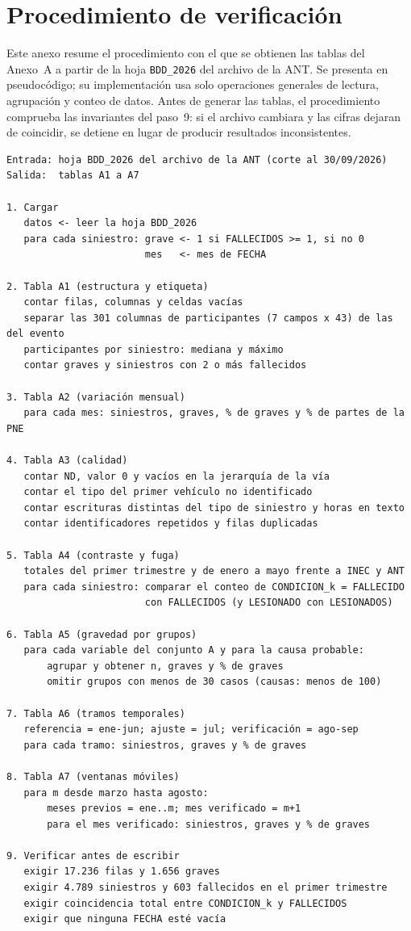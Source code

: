 \section{Procedimiento de verificación}

Este anexo resume el procedimiento con el que se obtienen las tablas del Anexo~A a partir de la hoja \texttt{BDD\_2026} del archivo de la ANT. Se presenta en pseudocódigo; su implementación usa solo operaciones generales de lectura, agrupación y conteo de datos. Antes de generar las tablas, el procedimiento comprueba las invariantes del paso~9: si el archivo cambiara y las cifras dejaran de coincidir, se detiene en lugar de producir resultados inconsistentes.

\begin{lstlisting}[style=codigo,caption={Procedimiento de verificación y generación de las tablas A1 a A7},label={lst:procedimiento}]
Entrada: hoja BDD_2026 del archivo de la ANT (corte al 30/09/2026)
Salida:  tablas A1 a A7

1. Cargar
   datos <- leer la hoja BDD_2026
   para cada siniestro: grave <- 1 si FALLECIDOS >= 1, si no 0
                        mes   <- mes de FECHA

2. Tabla A1 (estructura y etiqueta)
   contar filas, columnas y celdas vacías
   separar las 301 columnas de participantes (7 campos x 43) de las del evento
   participantes por siniestro: mediana y máximo
   contar graves y siniestros con 2 o más fallecidos

3. Tabla A2 (variación mensual)
   para cada mes: siniestros, graves, % de graves y % de partes de la PNE

4. Tabla A3 (calidad)
   contar ND, valor 0 y vacíos en la jerarquía de la vía
   contar el tipo del primer vehículo no identificado
   contar escrituras distintas del tipo de siniestro y horas en texto
   contar identificadores repetidos y filas duplicadas

5. Tabla A4 (contraste y fuga)
   totales del primer trimestre y de enero a mayo frente a INEC y ANT
   para cada siniestro: comparar el conteo de CONDICION_k = FALLECIDO
                        con FALLECIDOS (y LESIONADO con LESIONADOS)

6. Tabla A5 (gravedad por grupos)
   para cada variable del conjunto A y para la causa probable:
       agrupar y obtener n, graves y % de graves
       omitir grupos con menos de 30 casos (causas: menos de 100)

7. Tabla A6 (tramos temporales)
   referencia = ene-jun; ajuste = jul; verificación = ago-sep
   para cada tramo: siniestros, graves y % de graves

8. Tabla A7 (ventanas móviles)
   para m desde marzo hasta agosto:
       meses previos = ene..m; mes verificado = m+1
       para el mes verificado: siniestros, graves y % de graves

9. Verificar antes de escribir
   exigir 17.236 filas y 1.656 graves
   exigir 4.789 siniestros y 603 fallecidos en el primer trimestre
   exigir coincidencia total entre CONDICION_k y FALLECIDOS
   exigir que ninguna FECHA esté vacía
\end{lstlisting}
